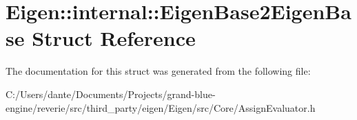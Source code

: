 \hypertarget{struct_eigen_1_1internal_1_1_eigen_base2_eigen_base}{}\section{Eigen\+::internal\+::Eigen\+Base2\+Eigen\+Base Struct Reference}
\label{struct_eigen_1_1internal_1_1_eigen_base2_eigen_base}


The documentation for this struct was generated from the following file\+:\begin{DoxyCompactItemize}
\item 
C\+:/\+Users/dante/\+Documents/\+Projects/grand-\/blue-\/engine/reverie/src/third\+\_\+party/eigen/\+Eigen/src/\+Core/Assign\+Evaluator.\+h\end{DoxyCompactItemize}
